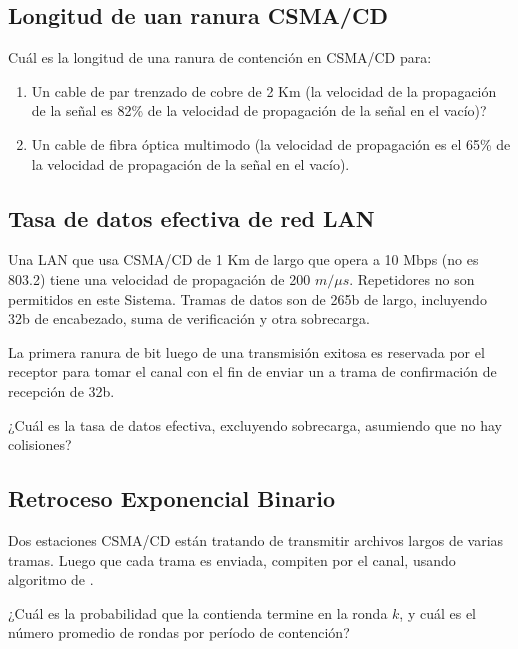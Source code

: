 \documentclass[12pt]{report}
\begin{document}
\begin{exer}
	\subsection{Longitud de uan ranura CSMA/CD \sthree}
	Cuál es la longitud de una ranura de contención en CSMA/CD para:

	\begin{enumerate}
		\item Un cable de par trenzado de cobre de 2 Km (la velocidad de la propagación de la señal es 82\% de la velocidad de propagación de la señal en el vacío)?
		\item Un cable de fibra óptica multimodo (la velocidad de propagación es el 65\% de la velocidad de propagación de la señal en el vacío).
	\end{enumerate}
\end{exer}

\begin{exer}
	\subsection{Tasa de datos efectiva de red LAN \sthree}
	Una LAN que usa CSMA/CD de 1 Km de largo que opera a 10 Mbps (no es 803.2)
	tiene una velocidad de propagación de 200 $m/\mu s$. Repetidores no son permitidos en este
	Sistema. Tramas de datos son de 265b de largo, incluyendo 32b de encabezado, suma de
	verificación y otra sobrecarga.

	La primera ranura de bit luego de una transmisión exitosa es reservada por el receptor para tomar el canal con el fin de enviar un a trama de confirmación de recepción de 32b.

	¿Cuál es la tasa de datos efectiva, excluyendo sobrecarga, asumiendo que no hay colisiones?
\end{exer}

\begin{exer}
	\subsection{Retroceso Exponencial Binario \sthree}
	Dos estaciones CSMA/CD están tratando de transmitir archivos largos de varias tramas. Luego que cada trama es enviada, compiten por el canal, usando algoritmo de .

	¿Cuál es la probabilidad que la contienda termine en la ronda $k$, y cuál es el número promedio de rondas por período de contención?
\end{exer}
\end{document}

